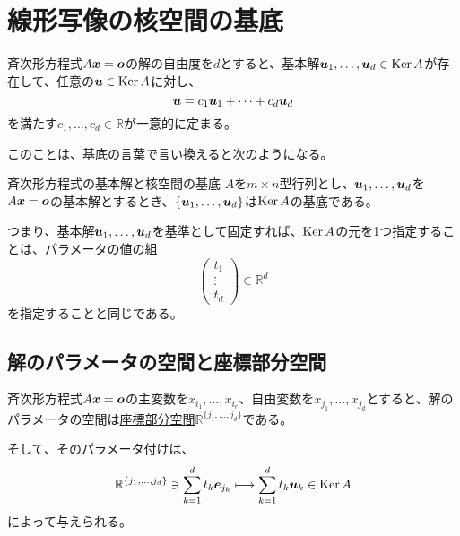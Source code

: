 \documentclass[../../../topic_linear-algebra]{subfiles}
\begin{document}
\sectionline
\section{線形写像の核空間の基底}

斉次形方程式$A\vb*{x} = \vb*{o}$の解の自由度を$d$とすると、基本解$\vb*{u}_1, \dots, \vb*{u}_d \in \operatorname{Ker} A$が存在して、任意の$\vb*{u} \in \operatorname{Ker} A$に対し、
\begin{equation*}
  \vb*{u} = c_1 \vb*{u}_1 + \cdots + c_d \vb*{u}_d
\end{equation*}
を満たす$c_1, \dots, c_d \in \mathbb{R}$が一意的に定まる。

\br

このことは、基底の言葉で言い換えると次のようになる。

\begin{theorem}{斉次形方程式の基本解と核空間の基底}
  $A$を$m \times n$型行列とし、$\vb*{u}_1, \dots, \vb*{u}_d$を$A\vb*{x} = \vb*{o}$の基本解とするとき、$\{ \vb*{u}_1, \dots, \vb*{u}_d \}$は$\operatorname{Ker} A$の基底である。
\end{theorem}

\br

つまり、基本解$\vb*{u}_1, \dots, \vb*{u}_d$を基準として固定すれば、$\operatorname{Ker} A$の元を1つ指定することは、パラメータの値の組
\begin{equation*}
  \begin{pmatrix}
    t_1    \\
    \vdots \\
    t_d
  \end{pmatrix} \in \mathbb{R}^d
\end{equation*}
を指定することと同じである。

\subsection{解のパラメータの空間と座標部分空間}

斉次形方程式$A\vb*{x} = \vb*{o}$の主変数を$x_{i_1}, \dots, x_{i_r}$、自由変数を$x_{j_1}, \dots, x_{j_d}$とすると、解のパラメータの空間は\hyperref[def:coordinate-subspace]{座標部分空間}$\mathbb{R}^{\{ j_1, \dots, j_d \}}$である。

\br

そして、そのパラメータ付けは、
\begin{equation*}
  \mathbb{R}^{\{ j_1, \dots, j_d \}} \ni \sum_{k=1}^d t_k \vb*{e}_{j_k} \longmapsto \sum_{k=1}^d t_k \vb*{u}_k \in \operatorname{Ker} A
\end{equation*}
によって与えられる。
\end{document}

